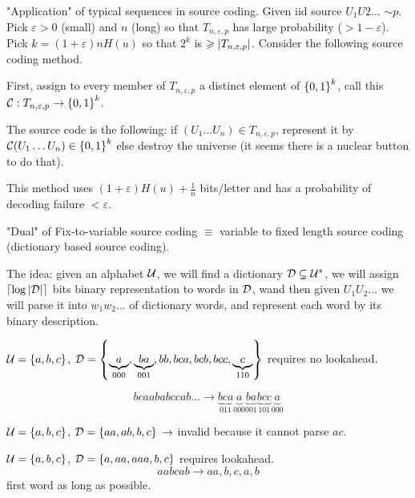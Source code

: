 \bigskip

"Application" of typical sequences in source coding. Given iid source $U_1U2\ldots$ $\sim p$. Pick $\varepsilon > 0$ (small) and $n$ (long) so that $T_{n,\varepsilon, p}$ has large probability ($>1-\varepsilon$). Pick $k = (1+\varepsilon)nH(u)$ so that $2^k$ is $\geqslant \left\lvert T_{n,\varepsilon, p}\right\rvert$. Consider the following source coding method.

First, assign to every member of $T_{n,\varepsilon,p}$ a distinct element of $\left\{ 0,1 \right\}^k$, call this $\mathcal{C} : T_{n,\varepsilon,p} \to \left\{ 0,1 \right\}^k$.

The source code is the following: if $(U_1\ldots U_n)\in T_{n,\varepsilon,p}$, represent it by $\mathcal{C}(U_1\ldots U_n)\in\left\{ 0,1 \right\}^k$ else destroy the universe (it seems there is a nuclear button to do that).

This method uses $(1+\varepsilon) H(u) + \frac{1}{n}$ bits/letter and has a probability of decoding failure $< \varepsilon$.


\bigskip

"Dual" of Fix-to-variable source coding $\equiv$ variable to fixed length source coding (dictionary based source coding).

The idea: given an alphabet $\mathcal{U}$, we will find a dictionary $\mathcal{D} \subsetneq \mathcal{U}^*$, we will assign $\left\lceil \log\left\lvert\mathcal{D}\right\rvert \right\rceil$ bits binary representation to words in $\mathcal{D}$, wand then given $U_1U_2\ldots$ we will parse it into $w_1w_2\ldots$ of dictionary words, and represent each word by its binary description.

\begin{example}\label{codes_fixed_to_fixed:ex:1}
    $\mathcal{U} = \left\{ a,b,c \right\}$, $\mathcal{D} = \left\{ \underbrace{a}_{000},\underbrace{ba}_{001},bb,bca,bcb,bcc,\underbrace{c}_{110} \right\}$ requires no lookahead.
    
    \[
        bcaababccab\ldots \to \underbrace{bca}_{011} \underbrace{a}_{000} \underbrace{ba}_{001}\underbrace{bcc}_{101}\underbrace{a}_{000}
    \]
\end{example}

\begin{example}\label{codes_fixed_to_fixed:ex:2}
    $\mathcal{U} = \left\{ a,b,c \right\}$, $\mathcal{D}=\left\{ aa,ab,b,c \right\}$ $\rightarrow$ invalid because it cannot parse $ac$.
\end{example}

\begin{example}\label{codes_fixed_to_fixed:ex:3}
    $\mathcal{U} = \left\{ a,b,c \right\}$, $\mathcal{D}=\left\{ a,aa,aaa,b,c \right\}$ requires lookahead.
    \[
        aabcab \to aa,b,c,a,b    
    \]
    first word as long as possible.
\end{example}

